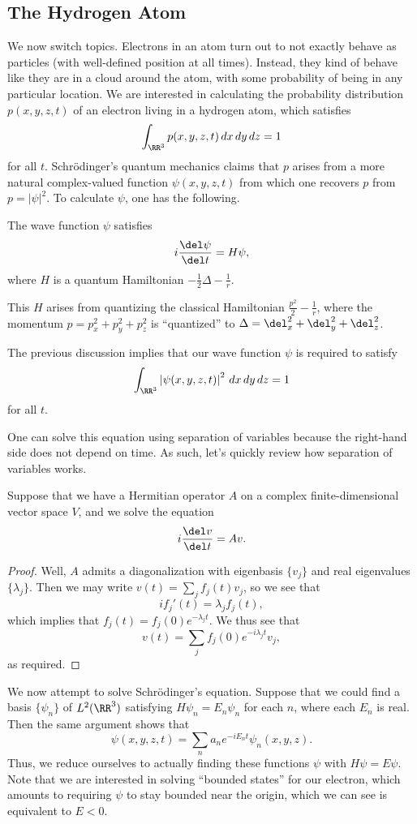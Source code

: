 \documentclass[../notes.tex]{subfiles}
\begin{document}
\subsection{The Hydrogen Atom}
We now switch topics. Electrons in an atom turn out to not exactly behave as particles (with well-defined position at all times). Instead, they kind of behave like they are in a cloud around the atom, with some probability of being in any particular location. We are interested in calculating the probability distribution $p(x,y,z,t)$ of an electron living in a hydrogen atom, which satisfies
\[\int_{\RR^3}p(x,y,z,t)\,dx\,dy\,dz=1\]
for all $t$. Schr\"odinger's quantum mechanics claims that $p$ arises from a more natural complex-valued function $\psi(x,y,z,t)$ from which one recovers $p$ from $p=\left|\psi\right|^2$. To calculate $\psi$, one has the following.
\begin{theorem}
	The wave function $\psi$ satisfies
	\[i\frac{\del\psi}{\del t}=H\psi,\]
	where $H$ is a quantum Hamiltonian $-\frac12\Delta-\frac1r$.
\end{theorem}
\begin{remark}
	This $H$ arises from quantizing the classical Hamiltonian $\frac{p^2}2-\frac1r$, where the momentum $p=p_x^2+p_y^2+p_z^2$ is ``quantized'' to $\Delta=\del_x^2+\del_y^2+\del_z^2$.
\end{remark}
\begin{remark}
	The previous discussion implies that our wave function $\psi$ is required to satisfy
	\[\int_{\RR^3}\left|\psi(x,y,z,t)\right|^2\,dx\,dy\,dz=1\]
	for all $t$.
\end{remark}
One can solve this equation using separation of variables because the right-hand side does not depend on time. As such, let's quickly review how separation of variables works.
\begin{exe}
	Suppose that we have a Hermitian operator $A$ on a complex finite-dimen\-sional vector space $V$, and we solve the equation
	\[i\frac{\del v}{\del t}=Av.\]
\end{exe}
\begin{proof}
	Well, $A$ admits a diagonalization with eigenbasis $\{v_j\}$ and real eigenvalues $\{\lambda_j\}$. Then we may write $v(t)=\sum_jf_j(t)v_j$, so we see that
	\[if_j'(t)=\lambda_jf_j(t),\]
	which implies that $f_j(t)=f_j(0)e^{-\lambda_jt}$. We thus see that
	\[v(t)=\sum_jf_j(0)e^{-i\lambda_jt}v_j,\]
	as required.
\end{proof}
We now attempt to solve Schr\"odinger's equation. Suppose that we could find a basis $\{\psi_n\}$ of $L^2(\RR^3)$ satisfying $H\psi_n=E_n\psi_n$ for each $n$, where each $E_n$ is real. Then the same argument shows that
\[\psi(x,y,z,t)=\sum_na_ne^{-iE_nt}\psi_n(x,y,z).\]
Thus, we reduce ourselves to actually finding these functions $\psi$ with $H\psi=E\psi$. Note that we are interested in solving ``bounded states'' for our electron, which amounts to requiring $\psi$ to stay bounded near the origin, which we can see is equivalent to $E<0$.
\end{document}
